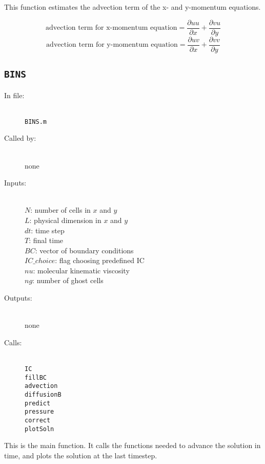 \documentclass[12pt]{article}
\begin{document}
This function  estimates the advection term of the x- and y-momentum equations.

\[ \text{advection term for x-momentum equation} = \frac{\partial uu}{\partial x} + \frac{\partial vu}{\partial y} \]
\[ \text{advection term for y-momentum equation} = \frac{\partial uv}{\partial x} + \frac{\partial vv}{\partial y} \]


\subsection{\texttt{BINS}}
\begin{description}
\item[In file:] \hfill \\ \texttt{BINS.m}
\item[Called by:] \hfill \\ none
\item[Inputs:] \hfill \\ $N$: number of cells in $x$ and $y$ \\ $L$: physical dimension in $x$ and $y$ \\ $dt$: time step \\ $T$: final time \\ $BC$: vector of boundary conditions \\ $IC\_choice$: flag choosing predefined IC \\ $nu$: molecular kinematic viscosity \\ $ng$: number of ghost cells
\item[Outputs:] \hfill \\ none
\item[Calls:] \hfill \\ \texttt{IC} \\ \texttt{fillBC} \\ \texttt{advection} \\ \texttt{diffusionB} \\ \texttt{predict} \\ \texttt{pressure} \\ \texttt{correct} \\ \texttt{plotSoln}
\end{description}
This is the main function.  It calls the functions needed to advance the solution in time, and plots the solution at the last timestep.
\end{document}
